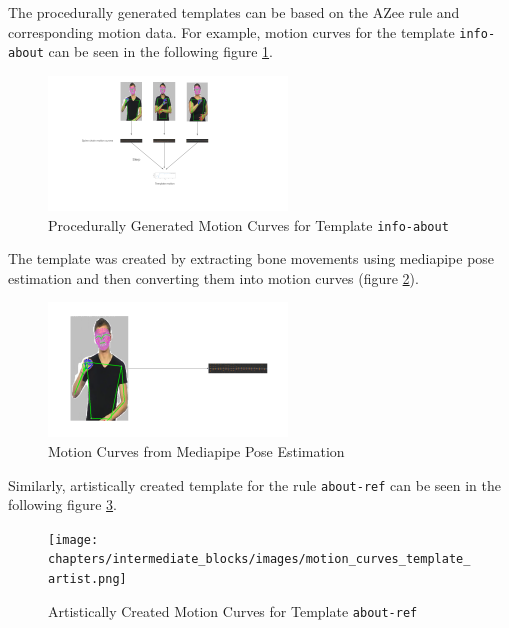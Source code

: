 \documentclass[../../main.tex]{subfiles}
\begin{document}
The procedurally generated templates can be based on the AZee rule and corresponding motion data. For example, motion curves for the template \texttt{info-about} can be seen in the following figure \ref{fig:motion_curves_template_procedural}.

\begin{figure}
    \centering \includegraphics[width = 2.5in]{chapters/intermediate_blocks/images/motion_curves_template_procedural.png}
    \caption{Procedurally Generated Motion Curves for Template \texttt{info-about}}
    \label{fig:motion_curves_template_procedural}
\end{figure}

The template was created by extracting bone movements using mediapipe pose estimation and then converting them into motion curves (figure \ref{fig:motion_curves_mediapipe}).

\begin{figure}
    \centering \includegraphics[width = 2.5in]{chapters/intermediate_blocks/images/motion_curves_mediapipe.png}
    \caption{Motion Curves from Mediapipe Pose Estimation}
    \label{fig:motion_curves_mediapipe}
\end{figure}

Similarly, artistically created template for the rule \texttt{about-ref} can be seen in the following figure \ref{fig:motion_curves_template_artist}.

\begin{figure}
    \centering \texttt{[image: chapters/intermediate\_blocks/images/motion\_curves\_template\_artist.png]}
    \caption{Artistically Created Motion Curves for Template \texttt{about-ref}}
    \label{fig:motion_curves_template_artist}
\end{figure}
\end{document}
